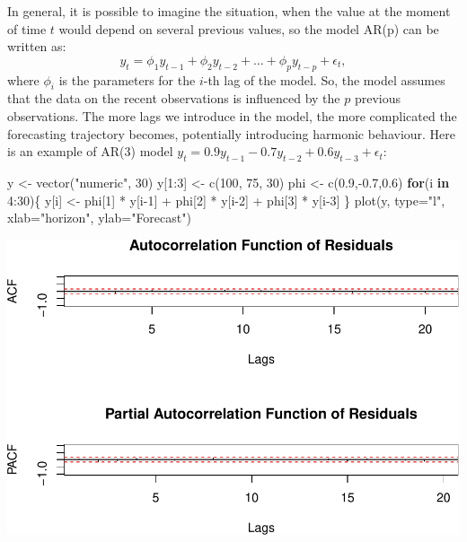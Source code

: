 \documentclass[
]{book}
\newenvironment{Shaded}{\begin{snugshade}}{\end{snugshade}}
\newcommand{\AttributeTok}[1]{\textcolor[rgb]{0.77,0.63,0.00}{#1}}
\newcommand{\ControlFlowTok}[1]{\textcolor[rgb]{0.13,0.29,0.53}{\textbf{#1}}}
\newcommand{\DecValTok}[1]{\textcolor[rgb]{0.00,0.00,0.81}{#1}}
\newcommand{\FloatTok}[1]{\textcolor[rgb]{0.00,0.00,0.81}{#1}}
\newcommand{\FunctionTok}[1]{\textcolor[rgb]{0.00,0.00,0.00}{#1}}
\newcommand{\NormalTok}[1]{#1}
\newcommand{\OtherTok}[1]{\textcolor[rgb]{0.56,0.35,0.01}{#1}}
\newcommand{\SpecialCharTok}[1]{\textcolor[rgb]{0.00,0.00,0.00}{#1}}
\newcommand{\StringTok}[1]{\textcolor[rgb]{0.31,0.60,0.02}{#1}}
\theoremstyle{definition}
\theoremstyle{definition}
\theoremstyle{definition}
\theoremstyle{definition}
\theoremstyle{remark}
\begin{document}
In general, it is possible to imagine the situation, when the value at the moment of time \(t\) would depend on several previous values, so the model AR(p) can be written as:
\begin{equation}
  {y}_{t} = \phi_1 y_{t-1} + \phi_2 y_{t-2} + \dots + \phi_p y_{t-p} + \epsilon_t ,
  \label{eq:ARIMAp00Example}
\end{equation}
where \(\phi_i\) is the parameters for the \(i\)-th lag of the model. So, the model assumes that the data on the recent observations is influenced by the \(p\) previous observations. The more lags we introduce in the model, the more complicated the forecasting trajectory becomes, potentially introducing harmonic behaviour. Here is an example of AR(3) model \({y}_{t} = 0.9 y_{t-1} -0.7 y_{t-2} + 0.6 y_{t-3} + \epsilon_t\):

\begin{Shaded}
\begin{Highlighting}[]
\NormalTok{y }\OtherTok{\textless{}{-}} \FunctionTok{vector}\NormalTok{(}\StringTok{"numeric"}\NormalTok{, }\DecValTok{30}\NormalTok{)}
\NormalTok{y[}\DecValTok{1}\SpecialCharTok{:}\DecValTok{3}\NormalTok{] }\OtherTok{\textless{}{-}} \FunctionTok{c}\NormalTok{(}\DecValTok{100}\NormalTok{, }\DecValTok{75}\NormalTok{, }\DecValTok{30}\NormalTok{)}
\NormalTok{phi }\OtherTok{\textless{}{-}} \FunctionTok{c}\NormalTok{(}\FloatTok{0.9}\NormalTok{,}\SpecialCharTok{{-}}\FloatTok{0.7}\NormalTok{,}\FloatTok{0.6}\NormalTok{)}
\ControlFlowTok{for}\NormalTok{(i }\ControlFlowTok{in} \DecValTok{4}\SpecialCharTok{:}\DecValTok{30}\NormalTok{)\{}
\NormalTok{    y[i] }\OtherTok{\textless{}{-}}\NormalTok{ phi[}\DecValTok{1}\NormalTok{] }\SpecialCharTok{*}\NormalTok{ y[i}\DecValTok{{-}1}\NormalTok{] }\SpecialCharTok{+}\NormalTok{ phi[}\DecValTok{2}\NormalTok{] }\SpecialCharTok{*}\NormalTok{ y[i}\DecValTok{{-}2}\NormalTok{] }\SpecialCharTok{+}\NormalTok{ phi[}\DecValTok{3}\NormalTok{] }\SpecialCharTok{*}\NormalTok{ y[i}\DecValTok{{-}3}\NormalTok{]}
\NormalTok{\}}
\FunctionTok{plot}\NormalTok{(y, }\AttributeTok{type=}\StringTok{"l"}\NormalTok{, }\AttributeTok{xlab=}\StringTok{"horizon"}\NormalTok{, }\AttributeTok{ylab=}\StringTok{"Forecast"}\NormalTok{)}
\end{Highlighting}
\end{Shaded}

\includegraphics{adam_files/figure-latex/unnamed-chunk-53-1.pdf}
\end{document}
